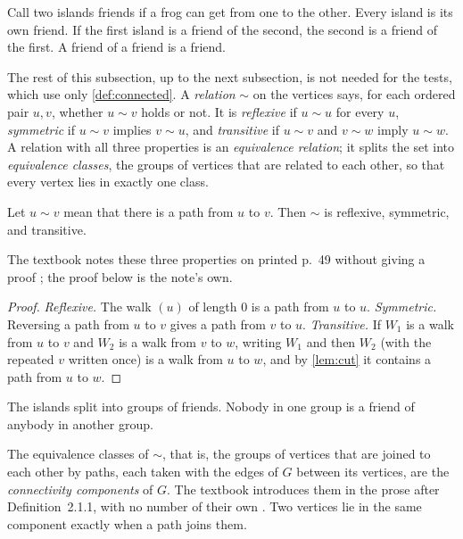 \plainwords{} Call two islands friends if a frog can get from one to the
other. Every island is its own friend. If the first island is a friend of
the second, the second is a friend of the first. A friend of a friend is a
friend.

The rest of this subsection, up to the next subsection, is not needed for
the tests, which use only \cref{def:connected}. A \emph{relation} $\sim$ on the vertices says, for each ordered pair
$u,v$, whether $u\sim v$ holds or not. It is \emph{reflexive} if $u\sim u$
for every $u$, \emph{symmetric} if $u\sim v$ implies $v\sim u$, and
\emph{transitive} if $u\sim v$ and $v\sim w$ imply $u\sim w$. A relation with
all three properties is an \emph{equivalence relation}; it splits the set
into \emph{equivalence classes}, the groups of vertices that are related to
each other, so that every vertex lies in exactly one class.

\begin{lemma}\label{lem:equiv}
Let $u\sim v$ mean that there is a path from $u$ to $v$. Then $\sim$ is
reflexive, symmetric, and transitive.
\end{lemma}
The textbook notes these three properties on printed p.~49 without giving a
proof \cite{petrosyan2015graphs}; the proof below is the note's own.
\begin{proof}
\emph{Reflexive.} The walk $(u)$ of length $0$ is a path from $u$ to $u$.
\emph{Symmetric.} Reversing a path from $u$ to $v$ gives a path from $v$
to $u$. \emph{Transitive.} If $W_1$ is a walk from $u$ to $v$ and $W_2$ is a
walk from $v$ to $w$, writing $W_1$ and then $W_2$ (with the repeated $v$
written once) is a walk from $u$ to $w$, and by \cref{lem:cut} it contains
a path from $u$ to $w$.
\end{proof}

\plainwords{} The islands split into groups of friends. Nobody in one
group is a friend of anybody in another group.

\begin{definition}\label{def:component}
The equivalence classes of $\sim$, that is, the groups of vertices that
are joined to each other by paths, each taken with the edges of $G$ between
its vertices, are the \emph{connectivity components} of $G$. The textbook introduces them
in the prose after Definition~2.1.1, with no number of their own
\cite[p.~49]{petrosyan2015graphs}. Two vertices lie in the same component
exactly when a path joins them.
\end{definition}

